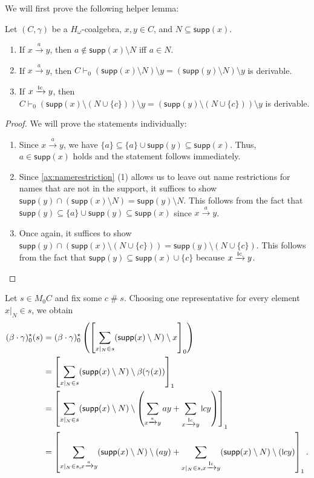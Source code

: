 \documentclass[a4paper,UKenglish,cleveref,thm-restate,numberwithinsect,final]{lipics-v2021}
\newcommand{\fresh}{\mathbin{\#}}
\newcommand{\supp}{\mathsf{supp}}
\theoremstyle{plain}
\newcommand{\midmid}{\hspace{0.2ex}{\rule[-0.1ex]{0.6pt}{1.65ex}}\hspace{0.2ex}}
\newcommand{\scriptmidmid}{\hspace{0.2ex}{\rule[-0.1ex]{0.6pt}{1.1ex}}\hspace{0.2ex}}
\newcommand{\newletter}[1]{{\midmid}#1}
\newcommand{\scriptnew}[1]{{\scriptmidmid}#1}
\numberwithin{equation}{section}
\newcommand{\+}[1]{\mathcal{#1}\xspace}
\theoremstyle{definition}
\begin{document}
We will first prove the following helper lemma:
\begin{lemma}
  \label{lem:explicit-kleisli-star-helper}
  Let $(C,\gamma)$ be a $H_\omega$-coalgebra, $x, y \in C$, and $N \subseteq \supp(x)$.
  \begin{enumerate}
    \item\label{itm:explicit-kleisli-star-free-cond}
      If $x \xrightarrow{a} y$, then $a \notin \supp(x) \setminus N$ iff $a \in N$.
    \item\label{itm:explicit-kleisli-star-free-eq}
      If $x \xrightarrow{a} y$, then $C \vdash_0 (\supp(x) \setminus N) \setminus y = (\supp(y) \setminus N) \setminus y$ is derivable.
    \item\label{itm:explicit-kleisli-star-bound-eq}
      If $x \xrightarrow{\scriptnew{c}} y$, then $C \vdash_0 (\supp(x) \setminus (N \cup \{c\})) \setminus y = (\supp(y) \setminus (N \cup \{c\})) \setminus y$ is derivable.
  \end{enumerate}
\end{lemma}
\begin{proof}
  We will prove the statements individually:
  \begin{enumerate}
    \item
      Since $x\xrightarrow{a}y$, we have $\{a\} \subseteq \{a\} \cup \supp(y) \subseteq \supp(x)$.
      Thus, $a \in \supp(x)$ holds and the statement follows immediately.
    \item
      Since \eqref{ax:namerestriction} (1) allows us to leave out name restrictions for names that are not in the support, it suffices to show $\supp(y) \cap (\supp(x) \setminus N) = \supp(y) \setminus N$.
      This follows from the fact that $\supp(y) \subseteq \{a\} \cup \supp(y) \subseteq \supp(x)$ since $x\xrightarrow{a}y$.
    \item
      Once again, it suffices to show $\supp(y) \cap (\supp(x) \setminus (N \cup \{c\})) = \supp(y) \setminus (N \cup \{c\})$.
      This follows from the fact that $\supp(y) \subseteq \supp(x) \cup \{c\}$ because $x \xrightarrow{\scriptnew{c}} y$.
  \end{enumerate}
\end{proof}

Let $s \in M_0C$ and fix some $c \fresh s$.
Choosing one representative for every element $x|_N \in s$, we obtain
\begin{align*}
  (\beta \cdot \gamma)^\star_0(s)
  &= (\beta \cdot \gamma)^\star_0\left( \left[ \sum_{x|_N \in s} (\supp(x) \setminus N) \setminus x \right]_0 \right) \\
  &= \left[ \sum_{x|_N \in s} (\supp(x) \setminus N) \setminus \beta(\gamma(x)) \right]_1 \\
  &= \left[ \sum_{x|_N \in s} (\supp(x) \setminus N) \setminus \left( \sum_{x \xrightarrow{a} y} ay + \sum_{x \xrightarrow{\scriptnew{c}} y} \newletter{c}y \right) \right]_1 \\
  &= \left[ \sum_{x|_N \in s, x \xrightarrow{a} y} (\supp(x) \setminus N) \setminus (ay) + \sum_{x|_N \in s, x \xrightarrow{\scriptnew{c}} y} (\supp(x) \setminus N) \setminus (\newletter{c}y) \right]_1.
\end{align*}
\end{document}
